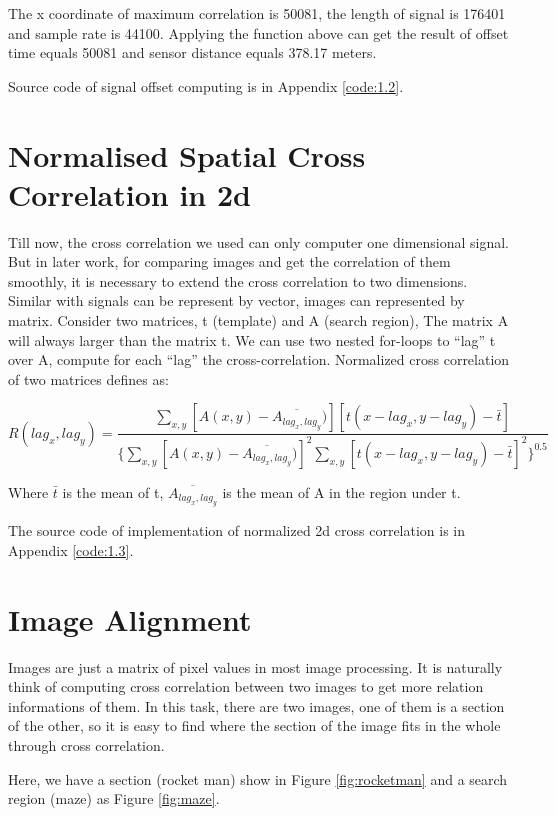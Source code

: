 The x coordinate of maximum correlation is 50081, the length of signal is 176401 and sample rate is 44100. Applying the function above can get the result of offset time equals 50081 and sensor distance equals 378.17 meters.

Source code of signal offset computing is in Appendix \ref{code:1.2}.

\section{Normalised Spatial Cross Correlation in 2d}

Till now, the cross correlation we used can only computer one dimensional signal. But in later work, for comparing images and get the correlation of them smoothly, it is necessary to extend the cross correlation to two dimensions. Similar with signals can be represent by vector, images can represented by matrix. Consider two matrices, t (template) and A (search region), The matrix A will always larger than the matrix t. We can use two nested for-loops to ``lag'' t over A, compute for each ``lag'' the cross-correlation. Normalized cross correlation of two matrices defines as:

\begin{equation*}
R(lag_{x},lag_{y})=
\frac{\sum_{x,y}[A(x,y)-\overline{A_{lag_{x},lag_{y}}})][t(x-lag_{x},y-lag_{y})-\bar{t}]}
{\{\sum_{x,y}[A(x,y)-\overline{A_{lag_{x},lag_{y}}})]^2
	\sum_{x,y}[t(x-lag_{x},y-lag_{y})-\bar{t}]^2
	\}^{0.5}}
\end{equation*}

Where $\bar{t}$ is the mean of t, $\overline{A_{lag_{x},lag_{y}}}$ is the mean of A in the region under t. 

The source code of implementation of normalized 2d cross correlation is in Appendix \ref{code:1.3}.

\section{Image Alignment}

Images are just a matrix of pixel values in most image processing. It is naturally think of computing cross correlation between two images to get more relation informations of them. In this task, there are two images, one of them is a section of the other, so it is easy to find where the section of the image fits in the whole through cross correlation.

Here, we have a section (rocket man) show in Figure \ref{fig:rocketman} and a search region (maze) as Figure \ref{fig:maze}.

